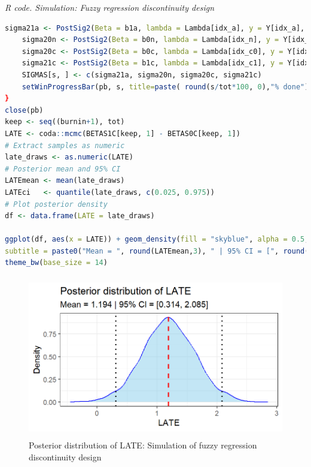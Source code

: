 \begin{tcolorbox}[enhanced,width=4.67in,center upper,
	fontupper=\large\bfseries,drop shadow southwest,sharp corners]
	\textit{R code. Simulation: Fuzzy regression discontinuity design}
	\begin{VF}
		\begin{lstlisting}[language=R]	
	sigma21a <- PostSig2(Beta = b1a, lambda = Lambda[idx_a], y = Y[idx_a], H = W[idx_a,])
	sigma20n <- PostSig2(Beta = b0n, lambda = Lambda[idx_n], y = Y[idx_n], H = W[idx_n,])
	sigma20c <- PostSig2(Beta = b0c, lambda = Lambda[idx_c0], y = Y[idx_c0], H = Wc[idx_c0,])
	sigma21c <- PostSig2(Beta = b1c, lambda = Lambda[idx_c1], y = Y[idx_c1], H = Wc[idx_c1,])
	SIGMAS[s, ] <- c(sigma21a, sigma20n, sigma20c, sigma21c)
	setWinProgressBar(pb, s, title=paste( round(s/tot*100, 0),"% done"))
}
close(pb)
keep <- seq((burnin+1), tot)
LATE <- coda::mcmc(BETAS1C[keep, 1] - BETAS0C[keep, 1])
# Extract samples as numeric
late_draws <- as.numeric(LATE)
# Posterior mean and 95% CI
LATEmean <- mean(late_draws)
LATEci   <- quantile(late_draws, c(0.025, 0.975))
# Plot posterior density
df <- data.frame(LATE = late_draws)

ggplot(df, aes(x = LATE)) + geom_density(fill = "skyblue", alpha = 0.5, color = "blue") + geom_vline(xintercept = LATEmean, color = "red", linetype = "dashed", linewidth = 1) + geom_vline(xintercept = LATEci, color = "black", linetype = "dotted", linewidth = 1) + labs(title = "Posterior distribution of LATE",
subtitle = paste0("Mean = ", round(LATEmean,3), " | 95% CI = [", round(LATEci[1],3), ", ", round(LATEci[2],3), "]"), x = "LATE", y = "Density") +
theme_bw(base_size = 14)
		\end{lstlisting}
	\end{VF}
\end{tcolorbox}  

\begin{figure}[h!]
	\includegraphics[width=340pt, height=200pt]{Chapters/chapter12/figures/FigFRD.png}
	\caption[List of figure caption goes here]{Posterior distribution of LATE: Simulation of fuzzy regression discontinuity design}\label{fig12_FRD}
\end{figure}


